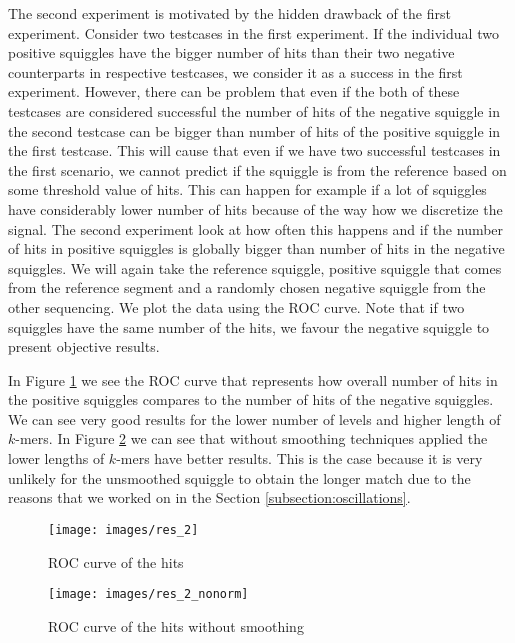 The second experiment is motivated by the hidden drawback of the first experiment. Consider
two testcases in the first experiment. If the individual two positive squiggles have
the bigger number of hits than their two negative counterparts in respective testcases,
we consider it as a success in the first experiment. However, there can be problem
that even if the both of these testcases are considered successful
the number of hits of the negative squiggle in the second testcase can be bigger than
number of hits of the positive squiggle in the first testcase. This will cause that
even if we have two successful testcases in the first scenario, we cannot predict
if the squiggle is from the reference based on some threshold value of hits. This
can happen for example if a lot of squiggles have considerably lower number of hits
because of the way how we discretize the signal. 
The second experiment look at how often this happens and if the number of hits in
positive squiggles is globally bigger than number of hits in the negative squiggles.
We will again take the reference squiggle, positive squiggle that comes from the
reference segment and a randomly chosen negative squiggle from the other sequencing.
We plot the data using the ROC curve. Note that if two squiggles have the same number
of the hits, we favour the negative squiggle to present objective results.

In Figure \ref{obr:res_2} we see the ROC curve that represents how overall number
of hits in the positive squiggles compares to the number of hits of the negative
squiggles. We can see very good results for the lower number of levels and higher
length of $k$-mers. In Figure \ref{obr:res_2_nonorm} we can see that without smoothing
techniques applied the lower lengths of $k$-mers have better results. This is
the case because it is very unlikely for the unsmoothed squiggle to obtain the longer
match due to the reasons that we worked on in the Section \ref{subsection:oscillations}.

\begin{figure}
\centerline{\texttt{[image: images/res\_2]}}
\caption[TODO]{ROC curve of the hits}
\label{obr:res_2}
\end{figure}

\begin{figure}
\centerline{\texttt{[image: images/res\_2\_nonorm]}}
\caption[TODO]{ROC curve of the hits without smoothing}
\label{obr:res_2_nonorm}
\end{figure}

